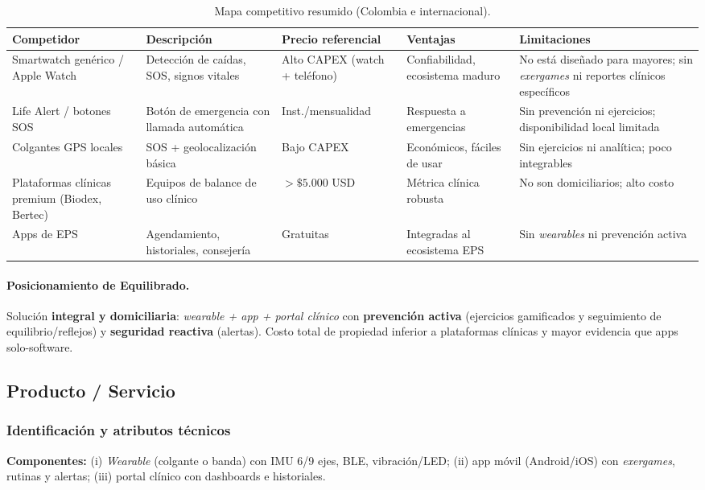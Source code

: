 \begin{table}[H]
\centering
\renewcommand{\arraystretch}{1.12}
\begin{tabular}{p{2.8cm} p{2.5cm} p{2.5cm} p{2.8cm} p{3.5cm}}
\toprule
\textbf{Competidor} & \textbf{Descripción} & \textbf{Precio referencial} & \textbf{Ventajas} & \textbf{Limitaciones}\\
\midrule
Smartwatch genérico / Apple Watch & Detección de caídas, SOS, signos vitales & Alto CAPEX (watch + teléfono) & Confiabilidad, ecosistema maduro & No está diseñado para mayores; sin \emph{exergames} ni reportes clínicos específicos \\
Life Alert / botones SOS & Botón de emergencia con llamada automática & Inst./mensualidad & Respuesta a emergencias & Sin prevención ni ejercicios; disponibilidad local limitada \\
Colgantes GPS locales & SOS + geolocalización básica & Bajo CAPEX & Económicos, fáciles de usar & Sin ejercicios ni analítica; poco integrables \\
Plataformas clínicas premium (Biodex, Bertec) & Equipos de balance de uso clínico & $>\$5.000$ USD & Métrica clínica robusta & No son domiciliarios; alto costo \\
Apps de EPS & Agendamiento, historiales, consejería & Gratuitas & Integradas al ecosistema EPS & Sin \emph{wearables} ni prevención activa \\
\bottomrule
\end{tabular}
\caption{Mapa competitivo resumido (Colombia e internacional).}
\end{table}

\paragraph{Posicionamiento de Equilibrado.} Solución \textbf{integral y domiciliaria}: \emph{wearable + app + portal clínico} con \textbf{prevención activa} (ejercicios gamificados y seguimiento de equilibrio/reflejos) y \textbf{seguridad reactiva} (alertas). Costo total de propiedad inferior a plataformas clínicas y mayor evidencia que apps solo-software.

\subsection{Producto / Servicio}

\subsubsection{Identificación y atributos técnicos}
\textbf{Componentes:} (i) \emph{Wearable} (colgante o banda) con IMU 6/9 ejes, BLE, vibración/LED; (ii) app móvil (Android/iOS) con \emph{exergames}, rutinas y alertas; (iii) portal clínico con dashboards e historiales.

